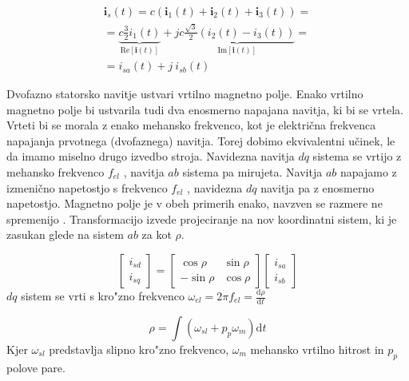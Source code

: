 \documentclass[journal,a4paper,twoside]{sty/IEEEtran}
\begin{document}
\begin{equation}
\begin{multlined}
{\textbf{i}_s}(t)= c (\textbf{i}_1(t)+\textbf{i}_2(t)+\textbf{i}_3(t))=\\
 = \underbrace{c \frac{3}{2}i_1(t)}_{\mathrm{Re}{[\textbf{i}(t)]}}+j \underbrace{c \frac{\sqrt{3}}{2}(i_2(t)-i_3(t))}_{\mathrm{Im}{[\textbf{i}(t)]}}= \\
  = i_{sa}(t)+j\:i_{sb}(t)\qquad \qquad \qquad\qquad\quad
  \end{multlined}
\end{equation}














Dvofazno statorsko navitje ustvari vrtilno magnetno polje. Enako vrtilno magnetno polje bi
ustvarila tudi dva enosmerno napajana navitja, ki bi se vrtela. Vrteti bi se morala z enako
mehansko frekvenco, kot je električna frekvenca napajanja prvotnega (dvofaznega) navitja. Torej
dobimo ekvivalentni učinek, le da imamo miselno drugo izvedbo stroja.
Navidezna navitja $dq$ sistema se vrtijo z mehansko frekvenco $f_{el}$ , navitja $ab$ sistema pa
mirujeta. Navitja $ab$ napajamo z izmenično napetostjo s frekvenco $f_{el}$ , navidezna $dq$ navitja pa
z enosmerno napetostjo. Magnetno polje je v obeh primerih enako, navzven se razmere ne
spremenijo \cite{denis}. Transformacijo izvede projeciranje na nov koordinatni sistem, ki je zasukan glede na sistem $ab$ za kot $\rho$.


\begin{equation}
\begin{bmatrix}
i_{sd}\\i_{sq}
\end{bmatrix}=
\begin{bmatrix}
\cos \rho& \sin \rho\\ -\sin\rho &\cos \rho
\end{bmatrix}
\begin{bmatrix}
i_{sa}\\i_{sb}
\end{bmatrix}
\end{equation}
$dq$ sistem se vrti s kro"zno frekvenco $\omega_{el}=2 \pi f_{el}=\frac{\mathrm{d} \rho}{\mathrm{d} t}$

\begin{equation}
\rho=\int (\omega_{sl}+p_p \omega_m)\mathrm{d}t
\end{equation}
Kjer $\omega_{sl}$ predstavlja slipno kro"zno frekvenco, $\omega_m$ mehansko vrtilno hitrost  in $p_p$ polove pare.
\end{document}
